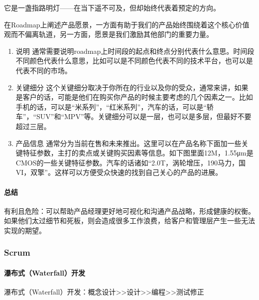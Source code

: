 \documentclass[letterpaper,10pt,english]{sphinxmanual}
\begin{document}
它是一盏指路明灯——在当下遥不可及，但却始终代表着预定的方向。

在Roadmap上阐述产品愿景，一方面有助于我们的产品始终围绕着这个核心价值观而不偏离轨道，另一方面，愿景是我们激励其他部门的重要力量。
\begin{enumerate}
%
\setcounter{enumi}{1}
\item {} 
说明
通常需要说明roadmap上时间段的起点和终点分别代表什么意思。时间段不同颜色代表什么意思，比如可以是不同颜色代表不同的技术平台，也可以是代表不同的市场。

\item {} 
关键细分
这个关键细分取决于你所在的行业以及你的受众，通常来讲，如果是客户的话，可能是他们在购买你产品的时候主要考虑的几个因素之一。比如手机的话，可以是“米系列”，“红米系列”，汽车的话，可以是“轿车”，“SUV”和“MPV”等。关键细分可以是一层，也可以是多层，但最好不要超过三层。

\item {} 
产品信息
通常分为当前在售和未来推出。这里可以在产品名称下面加一些关键特征参数，主打的卖点或关键购买因素等信息。如下图里面12M，1.55μm是CMOS的一些关键特征参数。汽车的话诸如“2.0T，涡轮增压，190马力，国VI，双擎”。这样可以方便受众快速的找到自己关心的产品的进展。

\end{enumerate}


\paragraph{总结}
\label{\detokenize{chapter_project/Roadmap:id5}}
有利且危险：可以帮助产品经理更好地可视化和沟通产品战略，形成健康的权衡。如果他们太过细节和死板，则会造成很多工作浪费，给客户和管理层产生一些无法实现的期望。


\subsubsection{Scrum}
\label{\detokenize{chapter_project/Scrum:scrum}}\label{\detokenize{chapter_project/Scrum::doc}}

\paragraph{瀑布式（Waterfall）开发}
\label{\detokenize{chapter_project/Scrum:waterfall}}
瀑布式（Waterfall）开发：概念设计>>设计>>编程>>测试修正
%
\begin{footnote}[811]\sphinxAtStartFootnote
{}
%
\end{footnote}
\end{document}
